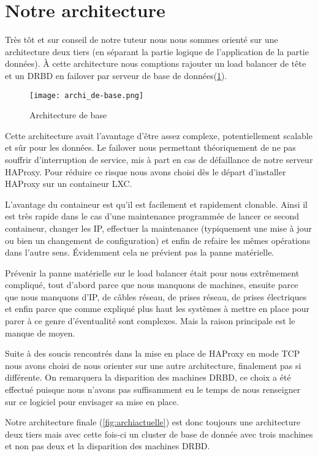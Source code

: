 \documentclass[a4paper,10pt,one side,titlepage]{report}
\begin{document}
\section{Notre architecture}
Très tôt et sur conseil de notre tuteur nous nous sommes orienté sur une architecture 
deux tiers (en séparant la partie logique de l'application de la partie données). 
À cette architecture nous comptions rajouter un \gls{load balancer} de tête et un 
DRBD en \gls{failover} par serveur de base de données(\ref{fig:archidebase}).

\begin{figure}[H]
    \centering
    \texttt{[image: archi\_de-base.png]}
    \caption{Architecture de base}
    \label{fig:archidebase}
\end{figure}

Cette architecture avait l'avantage d'être assez complexe, potentiellement scalable
et sûr pour les données. Le \gls{failover} nous permettant théoriquement de ne pas 
souffrir d'interruption de service, mis à part en cas de défaillance de notre serveur
HAProxy. Pour réduire ce risque nous avons choisi dès le départ d'installer HAProxy
sur un containeur LXC. 

L'avantage du containeur est qu'il est facilement et rapidement clonable. Ainsi il
est très rapide dans le cas d'une maintenance programmée de lancer ce second containeur, 
changer les IP, effectuer la maintenance (typiquement une mise à jour ou bien un 
changement de configuration) et enfin de refaire les mêmes opérations dans l'autre
sens. Évidemment cela ne prévient pas la panne matérielle.

Prévenir la panne matérielle sur le \gls{load balancer} était pour nous extrêmement 
compliqué, tout d'abord parce que nous manquons de machines, ensuite parce que nous 
manquons d'IP, de câbles réseau, de prises réseau, de prises électriques et enfin 
parce que comme expliqué plus haut les systèmes à mettre en place pour parer à ce 
genre d'éventualité sont complexes. Mais la raison principale est le manque de moyen.


Suite à des soucis rencontrés dans la mise en place de HAProxy en mode TCP nous avons
choisi de nous orienter sur une autre architecture, finalement pas si différente.
On remarquera la disparition des machines DRBD, ce choix a été effectué  puisque nous
n'avons pas suffisamment eu le temps de nous renseigner sur ce logiciel pour 
envisager sa mise en place.

Notre architecture finale (\ref{fig:archiactuelle}) est donc toujours une architecture deux tiers mais avec
cette fois-ci un cluster de base de donnée avec trois machines et non pas deux et la disparition
des machines DRBD.
\end{document}
